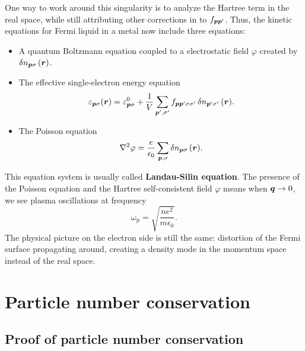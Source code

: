 \documentclass[hyperref, a4paper]{article}
\newcommand*{\concept}[1]{{\textbf{#1}}}
\begin{document}
One way to work around this singularity 
is to analyze the Hartree term in the real space, 
while still attributing other corrections in 
to $f_{\vb*{p} \vb*{p}'}$.
Thus, the kinetic equations for Fermi liquid in a metal 
now include three equations: 
\begin{itemize}
    \item A quantum Boltzmann equation coupled to a electrostatic field $\varphi$
    created by $\var{n}_{\vb*{p} \sigma}(\vb*{r})$.
    \item The effective single-electron energy equation 
    \begin{equation}
        \varepsilon_{\vb*{p} \sigma}(\vb*{r}) = \varepsilon^0_{\vb*{p} \sigma} 
        + \frac{1}{V} \sum_{\vb*{p}', \sigma'} 
        f_{\vb*{p} \vb*{p}' \sigma \sigma'} \var{n}_{\vb*{p}' \sigma'}(\vb*{r}).
    \end{equation}
    \item The Poisson equation 
    \begin{equation}
        \laplacian \varphi = \frac{e}{\epsilon_0} \sum_{\vb*{p}, \sigma} \var{n}_{\vb*{p} \sigma}(\vb*{r}).
    \end{equation}
\end{itemize}
This equation system is usually called \concept{Landau-Silin equation}.
The presence of the Poisson equation 
and the Hartree self-consistent field $\varphi$
means when $\vb*{q} \to 0$, 
we see plasma oscillations at frequency 
\begin{equation}
    \omega_{\text{p}} = \sqrt{\frac{n e^2}{m \epsilon_0}}.
\end{equation}
The physical picture on the electron side 
is still the same: 
distortion of the Fermi surface propagating around,
creating a density mode in the momentum space instead of the real space.

\section{Particle number conservation}

\subsection{Proof of particle number conservation}
\end{document}
